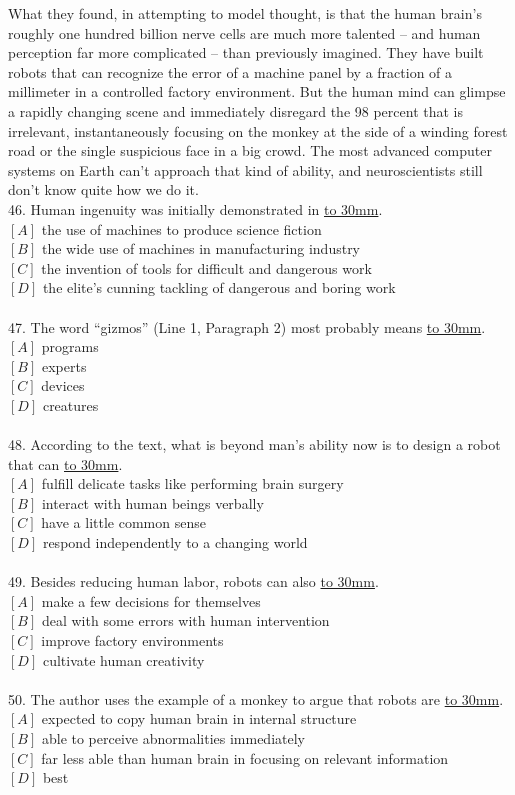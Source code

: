 \documentclass[a4paper]{article}
\begin{document}
\par
What they found, in attempting to model thought, is that the human brain’s roughly one hundred billion nerve cells are much more talented -- and human perception far more complicated -- than previously imagined. They have built robots that can recognize the error of a machine panel by a fraction of a millimeter in a controlled factory environment. But the human mind can glimpse a rapidly changing scene and immediately disregard the 98 percent that is irrelevant, instantaneously focusing on the monkey at the side of a winding forest road or the single suspicious face in a big crowd. The most advanced computer systems on Earth can’t approach that kind of ability, and neuroscientists still don’t know quite how we do it.
\\46.	Human ingenuity was initially demonstrated in \underline{\hbox to 30mm{}}.\\$[A]$ the use of machines to produce science fiction\\$[B]$ the wide use of machines in manufacturing industry\\$[C]$ the invention of tools for difficult and dangerous work\\$[D]$ the elite’s cunning tackling of dangerous and boring work\\\\47.	The word “gizmos” (Line 1, Paragraph 2) most probably means \underline{\hbox to 30mm{}}.\\$[A]$ programs\\$[B]$ experts\\$[C]$ devices\\$[D]$ creatures\\\\48.	According to the text, what is beyond man’s ability now is to design a robot that can \underline{\hbox to 30mm{}}.\\$[A]$ fulfill delicate tasks like performing brain surgery\\$[B]$ interact with human beings verbally\\$[C]$ have a little common sense\\$[D]$ respond independently to a changing world\\\\49.	Besides reducing human labor, robots can also \underline{\hbox to 30mm{}}.\\$[A]$ make a few decisions for themselves\\$[B]$ deal with some errors with human intervention\\$[C]$ improve factory environments\\$[D]$ cultivate human creativity\\\\50.	The author uses the example of a monkey to argue that robots are \underline{\hbox to 30mm{}}.\\$[A]$ expected to copy human brain in internal structure\\$[B]$ able to perceive abnormalities immediately\\$[C]$ far less able than human brain in focusing on relevant information\\$[D]$ best 
\end{document}
